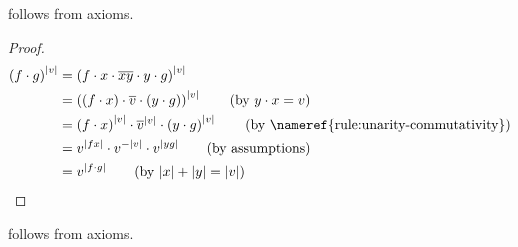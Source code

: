 \begin{claim}
     follows from axioms.
\end{claim}

\begin{proof}
    \begin{align*}
        \left( f \cdot g \right)^{|v|} &= \left( f \cdot x \cdot \overline{xy} \cdot y \cdot g \right)^{|v|} \\ 
                                                     &= \left( \left( f \cdot x \right) \cdot \overline v \cdot \left( y \cdot g \right) \right)^{|v|} \tag{by $y \cdot x = v$} \\ 
                                                     &= \left( f \cdot x \right)^{|v|} \cdot \overline{v}^{|v|} \cdot \left( y \cdot g \right)^{|v|} \tag{by \nameref{rule:unarity-commutativity}} \\ 
                                                     &= v^{|f x|} \cdot v^{-|v|} \cdot v^{|y g|} \tag{by assumptions} \\ 
                                                     &= v^{|f \cdot g|} \tag{by $|x| + |y| = |v|$}
    \end{align*}
\end{proof}

\begin{claim}
     follows from axioms.
\end{claim}

